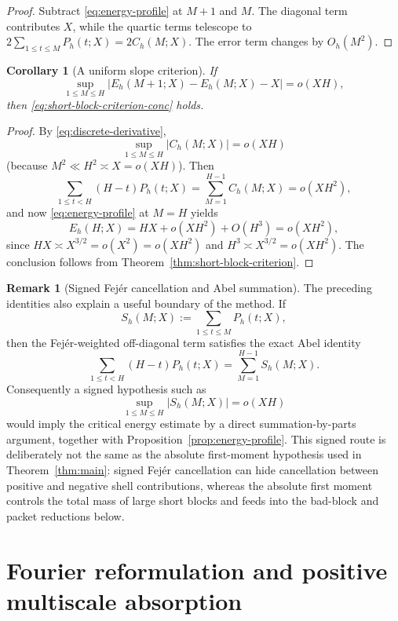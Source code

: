 \documentclass[11pt]{scrartcl}
\numberwithin{equation}{section}
\newtheorem{corollary}[theorem]{Corollary}
\theoremstyle{definition}
\newtheorem{remark}[theorem]{Remark}
\newcommand{\1}{\mathbf 1}
\newcommand{\abs}[1]{\left|#1\right|}
\begin{document}
\begin{proof}
Subtract \eqref{eq:energy-profile} at $M+1$ and $M$. The diagonal term contributes $X$, while the quartic terms telescope to $2\sum_{1\le t\le M}P_h(t;X)=2C_h(M;X)$. The error term changes by $O_h(M^2)$.
\end{proof}

\begin{corollary}[A uniform slope criterion]
\label{cor:uniform-slope-criterion}
If
\[
\sup_{1\le M\le H}\abs{E_h(M+1;X)-E_h(M;X)-X}=o(XH),
\]
then \eqref{eq:short-block-criterion-conc} holds.
\end{corollary}

\begin{proof}
By \eqref{eq:discrete-derivative},
\[
\sup_{1\le M\le H}\abs{C_h(M;X)}=o(XH)
\]
(because $M^2\ll H^2\asymp X=o(XH)$). Then
\[
\sum_{1\le t<H}(H-t)P_h(t;X)=\sum_{M=1}^{H-1}C_h(M;X)=o(XH^2),
\]
and now \eqref{eq:energy-profile} at $M=H$ yields
\[
E_h(H;X)=HX+o(XH^2)+O(H^3)=o(XH^2),
\]
since $HX\asymp X^{3/2}=o(X^2)=o(XH^2)$ and $H^3\asymp X^{3/2}=o(XH^2)$. The conclusion follows from Theorem~\ref{thm:short-block-criterion}.
\end{proof}


\begin{remark}[Signed Fej\'er cancellation and Abel summation]
\label{rem:signed-fejer-abel}
The preceding identities also explain a useful boundary of the method. If
\[
S_h(M;X):=\sum_{1\le t\le M}P_h(t;X),
\]
then the Fej\'er-weighted off-diagonal term satisfies the exact Abel identity
\[
\sum_{1\le t<H}(H-t)P_h(t;X)
=\sum_{M=1}^{H-1}S_h(M;X).
\]
Consequently a signed hypothesis such as
\[
\sup_{1\le M\le H}\abs{S_h(M;X)}=o(XH)
\]
would imply the critical energy estimate by a direct summation-by-parts argument, together with Proposition~\ref{prop:energy-profile}. This signed route is deliberately not the same as the absolute first-moment hypothesis used in Theorem~\ref{thm:main}: signed Fej\'er cancellation can hide cancellation between positive and negative shell contributions, whereas the absolute first moment controls the total mass of large short blocks and feeds into the bad-block and packet reductions below.
\end{remark}

\section{Fourier reformulation and positive multiscale absorption}
\label{sec:fourier}
\end{document}
